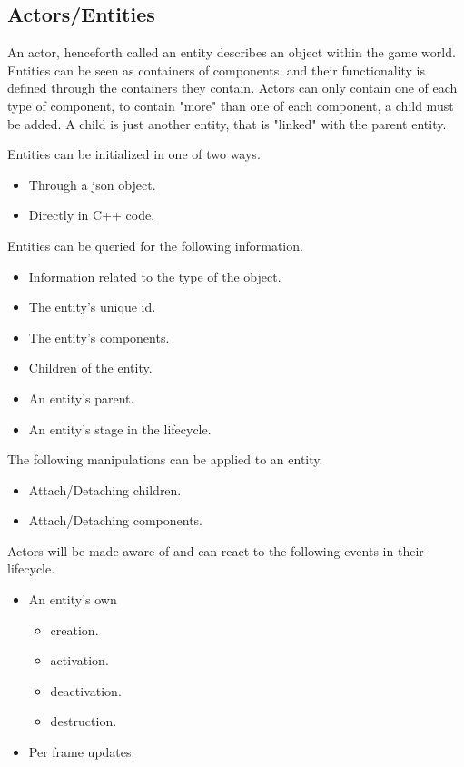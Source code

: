 \subsection{Actors/Entities}
An actor, henceforth called an entity describes an object within the game world. 
Entities can be seen as containers of components, 
and their functionality is defined through the containers they contain.
Actors can only contain one of each type of component, to contain "more" than one of each component, a child must be added. 
A child is just another entity, that is "linked" with the parent entity.

Entities can be initialized in one of two ways.
\begin{itemize}
    \item
    Through a json object.

    \item
    Directly in C++ code.
\end{itemize}

Entities can be queried for the following information.
\begin{itemize}
    \item
    Information related to the type of the object.

    \item
    The entity's unique id.

    \item
    The entity's components.

    \item
    Children of the entity.

    \item
    An entity's parent.

    \item
    An entity's stage in the lifecycle.
\end{itemize}

The following manipulations can be applied to an entity.
\begin{itemize}
    \item 
    Attach/Detaching children.

    \item
    Attach/Detaching components.
\end{itemize}

Actors will be made aware of and can react to the following events in their lifecycle.
\begin{itemize}
    \item
    An entity's own
    \begin{itemize}
        \item creation.
        \item activation.
        \item deactivation.
        \item destruction.
    \end{itemize}

    \item
    Per frame updates.
\end{itemize}
